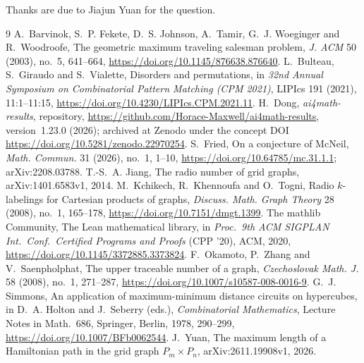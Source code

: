 \documentclass[11pt]{article}
\theoremstyle{remark}
\newcommand{\repoversion}{1.23.0}
\begin{document}
\medskip
\noindent Thanks are due to Jiajun Yuan for the question.

\begin{thebibliography}{9}
 A.~Barvinok, S.~P. Fekete, D.~S. Johnson, A.~Tamir,
G.~J. Woeginger and R.~Woodroofe, The geometric maximum traveling salesman
problem, \emph{J. ACM} 50 (2003), no.~5, 641--664,
\url{https://doi.org/10.1145/876638.876640}.
 L.~Bulteau, S.~Giraudo and S.~Vialette, Disorders and
permutations, in \emph{32nd Annual Symposium on Combinatorial Pattern Matching
(CPM 2021)}, LIPIcs 191 (2021), 11:1--11:15,
\url{https://doi.org/10.4230/LIPIcs.CPM.2021.11}.
 H.~Dong, \emph{ai4math-results}, repository,
\url{https://github.com/Horace-Maxwell/ai4math-results}, version~\repoversion{}
(2026); archived at Zenodo under the concept DOI
\url{https://doi.org/10.5281/zenodo.22970254}.
 S.~Fried, On a conjecture of McNeil, \emph{Math. Commun.} 31
(2026), no.~1, 1--10, \url{https://doi.org/10.64785/mc.31.1.1};
arXiv:2208.03788.
 T.-S.~A. Jiang, The radio number of grid graphs,
arXiv:1401.6583v1, 2014.
 M.~Kchikech, R.~Khennoufa and O.~Togni, Radio $k$-labelings for
Cartesian products of graphs, \emph{Discuss. Math. Graph Theory} 28 (2008),
no.~1, 165--178, \url{https://doi.org/10.7151/dmgt.1399}.
The mathlib Community, The Lean mathematical library, in \emph{Proc.\ 9th ACM
SIGPLAN Int.\ Conf.\ Certified Programs and Proofs} (CPP '20), ACM, 2020,
\url{https://doi.org/10.1145/3372885.3373824}.
 F.~Okamoto, P.~Zhang and V.~Saenpholphat, The upper traceable
number of a graph, \emph{Czechoslovak Math. J.} 58 (2008), no.~1, 271--287,
\url{https://doi.org/10.1007/s10587-008-0016-9}.
 G.~J. Simmons, An application of maximum-minimum distance
circuits on hypercubes, in D.~A. Holton and J.~Seberry (eds.),
\emph{Combinatorial Mathematics}, Lecture Notes in Math.~686, Springer, Berlin,
1978, 290--299, \url{https://doi.org/10.1007/BFb0062544}.
 J.~Yuan, The maximum length of a Hamiltonian path in the grid
graph $P_m\times P_n$, arXiv:2611.19908v1, 2026.
\end{thebibliography}
\end{document}
